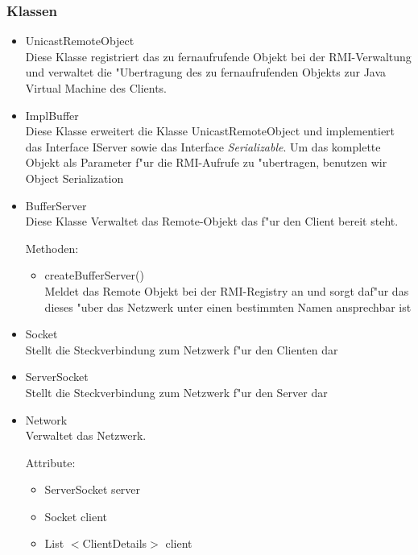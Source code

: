 \documentclass[a4paper,10pt]{article}
\begin{document}
\subsubsection{Klassen}
\begin{itemize}
\item UnicastRemoteObject \\
Diese Klasse registriert das zu fernaufrufende Objekt bei der RMI-Verwaltung und verwaltet die "Ubertragung des zu fernaufrufenden Objekts zur Java Virtual Machine des Clients.
\item ImplBuffer \\
Diese Klasse erweitert die Klasse UnicastRemoteObject und implementiert das Interface IServer sowie das Interface \textit{Serializable}. Um das komplette Objekt als Parameter f"ur die RMI-Aufrufe zu "ubertragen, benutzen wir Object Serialization 
\item BufferServer \\
Diese Klasse Verwaltet das Remote-Objekt das f"ur den Client bereit steht.

Methoden:
\begin{itemize}
\item createBufferServer()
\\Meldet das Remote Objekt bei der RMI-Registry an und sorgt daf"ur das dieses "uber das Netzwerk unter einen bestimmten Namen ansprechbar ist
\end{itemize}

\item Socket \\
Stellt die Steckverbindung zum Netzwerk f"ur den Clienten dar
\item ServerSocket\\
Stellt die Steckverbindung zum Netzwerk f"ur den Server dar
\item Network\\
Verwaltet das Netzwerk.

Attribute:
\begin{itemize}
\item ServerSocket server
\item Socket client
\item List $<$ClientDetails$>$ client
\end{itemize}


\end{itemize}
\end{document}
